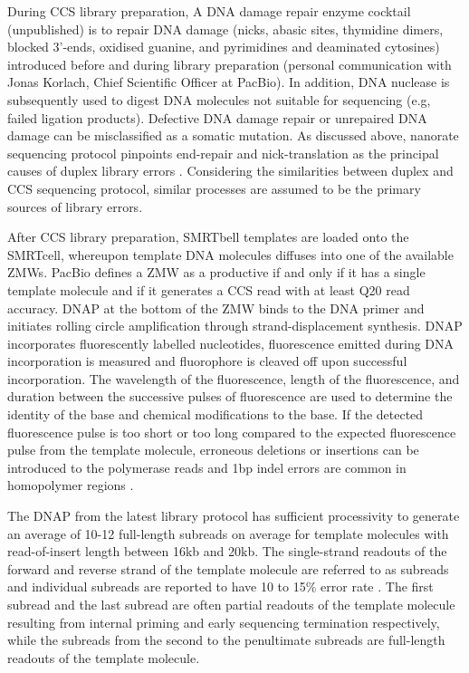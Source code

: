 During CCS library preparation, A DNA damage repair enzyme cocktail (unpublished) is to repair DNA damage (nicks, abasic sites, thymidine dimers, blocked 3’-ends, oxidised guanine, and pyrimidines and deaminated cytosines) introduced before and during library preparation (personal communication with Jonas Korlach, Chief Scientific Officer at PacBio). In addition, DNA nuclease is subsequently used to digest DNA molecules not suitable for sequencing (e.g, failed ligation products). Defective DNA damage repair or unrepaired DNA damage can be misclassified as a somatic mutation. As discussed above, nanorate sequencing protocol pinpoints end-repair and nick-translation as the principal causes of duplex library errors \cite{Abascal2021-pk}. Considering the similarities between duplex and CCS sequencing protocol, similar processes are assumed to be the primary sources of library errors.

After CCS library preparation, SMRTbell templates are loaded onto the SMRTcell, whereupon template DNA molecules diffuses into one of the available ZMWs. PacBio defines a ZMW as a productive if and only if it has a single template molecule and if it generates a CCS read with at least Q20 read accuracy. DNAP at the bottom of the ZMW binds to the DNA primer and initiates rolling circle amplification through strand-displacement synthesis. DNAP incorporates fluorescently labelled nucleotides, fluorescence emitted during DNA incorporation is measured and fluorophore is cleaved off upon successful incorporation. The wavelength of the fluorescence, length of the fluorescence, and duration between the successive pulses of fluorescence are used to determine the identity of the base and chemical modifications to the base. If the detected fluorescence pulse is too short or too long compared to the expected fluorescence pulse from the template molecule, erroneous deletions or insertions can be introduced to the polymerase reads \cite{Eid2009-ol} and 1bp indel errors are common in homopolymer regions \cite{Chaisson2012-vr}. 

The DNAP from the latest library protocol has sufficient processivity to generate an average of 10-12 full-length subreads on average for template molecules with read-of-insert length between 16kb and 20kb. The single-strand readouts of the forward and reverse strand of the template molecule are referred to as subreads and individual subreads are reported to have 10 to 15\% error rate \cite{Chaisson2012-vr}. The first subread and the last subread are often partial readouts of the template molecule resulting from internal priming and early sequencing termination respectively, while the subreads from the second to the penultimate subreads are full-length readouts of the template molecule.

